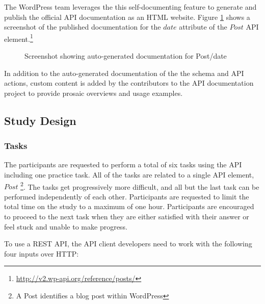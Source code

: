 \documentclass[conference]{IEEEtran}
\begin{document}
The WordPress team leverages the this self-documenting feature to generate and publish the official API documentation as an HTML website. Figure \ref{fig:schema} shows a screenshot of the published documentation for the $date$ attribute of the $Post$ API element.\footnote{\url{http://v2.wp-api.org/reference/posts/}}

\begin{figure}[h!]
\begin{center}
\end{center}
\caption{Screenshot showing auto-generated documentation for Post/date}
\label{fig:schema}
\end{figure}

In addition to the auto-generated documentation of the the schema and API actions, custom content is added by the contributors to the API documentation project to provide prosaic overviews and usage examples.



\subsection{Study Design} %
\subsubsection{Tasks} %

The participants are requested to perform a total of six tasks using the API including one practice task. All of the tasks are related to a single API element, $Post$ \footnote{A Post identifies a blog post within WordPress}. The tasks get progressively more difficult, and all but the last task can be performed independently of each other. Participants are requested to limit the total time on the study to a maximum of one hour. Participants are encouraged to proceed to the next task when they are either satisfied with their answer or feel stuck and unable to make progress.

To use a REST API, the API client developers need to work with the following four inputs over HTTP:
\end{document}
